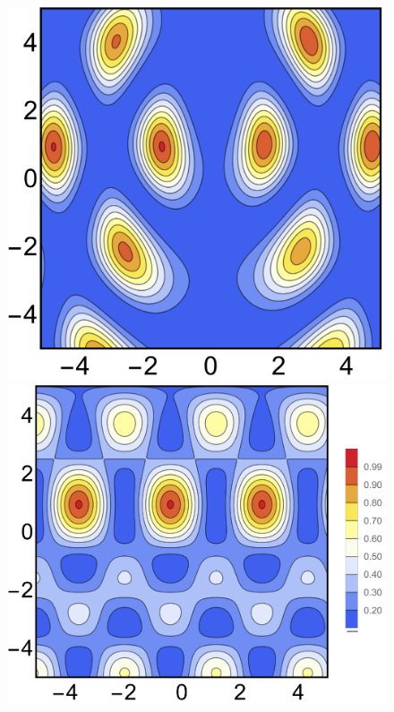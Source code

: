 \begin{figure}[tbh]
    \centering
    \hspace{-30pt}\begin{minipage}{0.45\linewidth}
        \centering
        \includegraphics[height=\textwidth]{Figures/gate-learning/GL_2dDensityPlot_Toffoli_Generator.png}
    \end{minipage}\hspace{20pt}
    \begin{minipage}{0.45\linewidth}
        \centering
        \includegraphics[height=\textwidth]{Figures/gate-learning/GL_2dDensityPlot_Toffoli_Generator2.png}

\end{minipage}
\end{figure}
